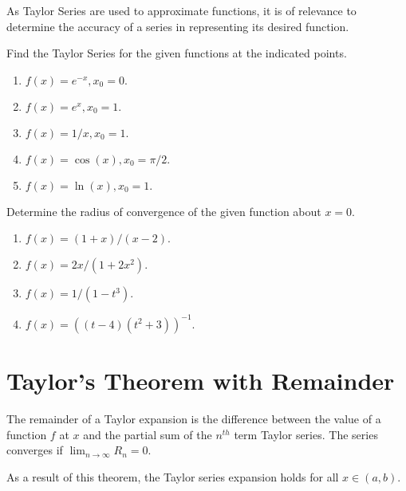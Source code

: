 As Taylor Series are used to approximate functions, it is of relevance to determine the accuracy of a series in representing its desired function. 
\exercises
\begin{exerciselist}
    \item Find the Taylor Series for the given functions at the indicated points. \begin{enumerate}[label=(\alph*)]
        \item $f(x) = e^{-x}, x_0 = 0.$
        \item $f(x) = e^x, x_0 = 1.$ 
        \item $f(x)=1/x, x_0 = 1.$
        \item $f(x) = \cos(x), x_0 = \pi/2.$ 
        \item $f(x) = \ln(x), x_0 = 1.$
    \end{enumerate}
    \item Determine the radius of convergence of the given function about $x=0$. \begin{enumerate}[label=(\alph*)]
        \item $f(x) = (1+x)/(x-2).$
        \item $f(x) = 2x/(1+2x^2).$
        \item $f(x) = 1/(1-t^3).$
        \item $f(x) = ((t-4)(t^2+3))^{-1}.$
    \end{enumerate} 
\end{exerciselist}

\section{Taylor's Theorem with Remainder}
The remainder of a Taylor expansion is the difference between the value of a function $f$ at $x$ and the partial sum of the $n^{th}$ term Taylor series. The series converges if $\lim_{n \rightarrow \infty} R_n = 0$. 

As a result of this theorem, the Taylor series expansion holds for all $x \in (a,b)$.

